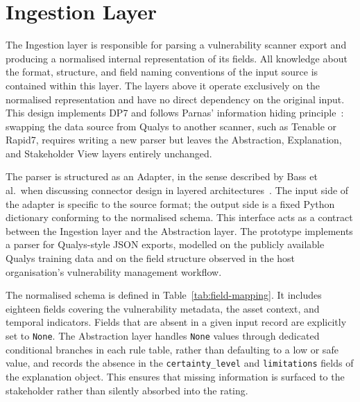 \section{Ingestion Layer}
\label{sec:ingestion}

The Ingestion layer is responsible for parsing a vulnerability scanner export and producing a normalised internal representation of its fields. All knowledge about the format, structure, and field naming conventions of the input source is contained within this layer. The layers above it operate exclusively on the normalised representation and have no direct dependency on the original input. This design implements DP7 and follows Parnas' information hiding principle~\cite{parnas1972modules}: swapping the data source from Qualys to another scanner, such as Tenable or Rapid7, requires writing a new parser but leaves the Abstraction, Explanation, and Stakeholder View layers entirely unchanged.

The parser is structured as an Adapter, in the sense described by Bass et al.\ when discussing connector design in layered architectures~\cite{bass2012software}. The input side of the adapter is specific to the source format; the output side is a fixed Python dictionary conforming to the normalised schema. This interface acts as a contract between the Ingestion layer and the Abstraction layer. The prototype implements a parser for Qualys-style JSON exports, modelled on the publicly available Qualys training data and on the field structure observed in the host organisation's vulnerability management workflow.

The normalised schema is defined in Table~\ref{tab:field-mapping}. It includes eighteen fields covering the vulnerability metadata, the asset context, and temporal indicators. Fields that are absent in a given input record are explicitly set to \texttt{None}. The Abstraction layer handles \texttt{None} values through dedicated conditional branches in each rule table, rather than defaulting to a low or safe value, and records the absence in the \texttt{certainty\_level} and \texttt{limitations} fields of the explanation object. This ensures that missing information is surfaced to the stakeholder rather than silently absorbed into the rating.

